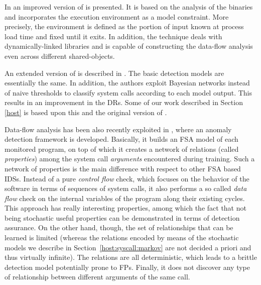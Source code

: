 In \citep{giffin} an improved version of
\citep{wagner:sp2001:staticanalysis} is presented. It is based on the
analysis of the binaries and incorporates the execution environment as
a model constraint. More precisely, the environment is defined as the
portion of input known at process load time and fixed until it
exits. In addition, the technique deals with dynamically-linked
libraries and is capable of constructing the data-flow analysis even
across different shared-objects.

An extended version of \LibAnomaly is described in
\citep{mutz06:syscalls}. The basic detection models are essentially
the same. In addition, the authors exploit Bayesian networks instead
of naive thresholds to classify system calls according to each model
output. This results in an improvement in the \acp{DR}. Some
of our work described in Section \ref{host} is based upon this and the
original version of \LibAnomaly.

Data-flow analysis has been also recently exploited in
\citep{venkat_dataflow}, where an anomaly detection framework is
developed. Basically, it builds an \ac{FSA} model of each monitored
program, on top of which it creates a network of relations (called
\emph{properties}) among the system call \emph{arguments} encountered
during training. Such a network of properties is the main difference
with respect to other \ac{FSA} based \acp{IDS}. Instead of
a pure \emph{control flow} check, which focuses on the behavior of the
software in terms of sequences of system calls, it also performs a so
called \emph{data flow} check on the internal variables of the program
along their existing cycles. This approach has really interesting
properties, among which the fact that not being stochastic useful
properties can be demonstrated in terms of detection assurance. On the
other hand, though, the set of relationships that can be learned is
limited (whereas the relations encoded by means of the stochastic
models we describe in Section~\ref{host:syscall:markov} are not
decided a priori and thus virtually infinite). The relations are all
deterministic, which leads to a brittle detection model potentially
prone to \acp{FP}. Finally, it does not discover any type of
relationship between different arguments of the same call.

